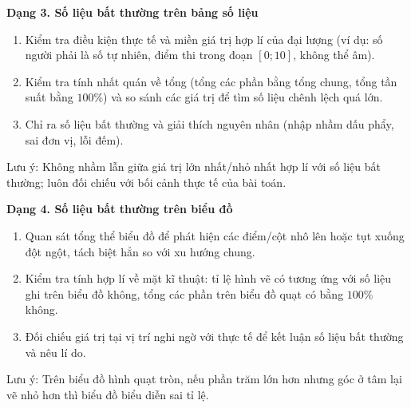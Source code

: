 \textbf{Dạng 3. Số liệu bất thường trên bảng số liệu}
\begin{enumerate}
\item Kiểm tra điều kiện thực tế và miền giá trị hợp lí của đại lượng (ví dụ: số người phải là số tự nhiên, điểm thi trong đoạn $[0; 10]$, không thể âm).
\item Kiểm tra tính nhất quán về tổng (tổng các phần bằng tổng chung, tổng tần suất bằng $100\%$) và so sánh các giá trị để tìm số liệu chênh lệch quá lớn.
\item Chỉ ra số liệu bất thường và giải thích nguyên nhân (nhập nhầm dấu phẩy, sai đơn vị, lỗi đếm).
\end{enumerate}
Lưu ý: Không nhầm lẫn giữa giá trị lớn nhất/nhỏ nhất hợp lí với số liệu bất thường; luôn đối chiếu với bối cảnh thực tế của bài toán.

\textbf{Dạng 4. Số liệu bất thường trên biểu đồ}
\begin{enumerate}
\item Quan sát tổng thể biểu đồ để phát hiện các điểm/cột nhô lên hoặc tụt xuống đột ngột, tách biệt hẳn so với xu hướng chung.
\item Kiểm tra tính hợp lí về mặt kĩ thuật: tỉ lệ hình vẽ có tương ứng với số liệu ghi trên biểu đồ không, tổng các phần trên biểu đồ quạt có bằng $100\%$ không.
\item Đối chiếu giá trị tại vị trí nghi ngờ với thực tế để kết luận số liệu bất thường và nêu lí do.
\end{enumerate}
Lưu ý: Trên biểu đồ hình quạt tròn, nếu phần trăm lớn hơn nhưng góc ở tâm lại vẽ nhỏ hơn thì biểu đồ biểu diễn sai tỉ lệ.
